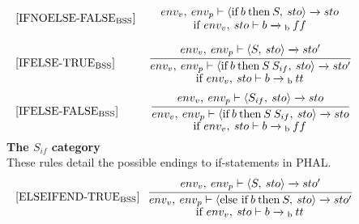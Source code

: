 \begin{equation}\label{listing:ifnoelse-false}
\begin{minipage}{.2\linewidth}
$[\text{IFNOELSE-FALSE}_\text{BSS}]$
\end{minipage}
\begin{minipage}{.8\linewidth}
\centering
$env_v, \: env_p \vdash \langle \text{if} \: b \: \text{then} \: S, \: sto \rangle \xrightarrow{} sto$ 
\\
if $env_v, \: sto \vdash b \xrightarrow{}\textsubscript{b} \: ff$
\end{minipage}
\end{equation}

\begin{equation}
\begin{minipage}{.2\linewidth}
$[\text{IFELSE-TRUE}_\text{BSS}]$
\end{minipage}
\begin{minipage}{.8\linewidth}
\centering
$\cfrac{env_v, \: env_p \vdash \langle S, \: sto \rangle \xrightarrow{} sto'}{env_v, \: env_p \vdash \langle \text{if} \: b \: \text{then} \: S \:S_{if}, \: sto \rangle \xrightarrow{} sto'}$ 
\\
if $env_v, \: sto \vdash b \xrightarrow{}\textsubscript{b} \: tt$
\end{minipage}
\end{equation}
\begin{equation}
\begin{minipage}{.2\linewidth}
$[\text{IFELSE-FALSE}_\text{BSS}]$
\end{minipage}
\begin{minipage}{.8\linewidth}
\centering
$\cfrac{env_v, \: env_p \vdash \langle S_{if}, \: sto \rangle \xrightarrow{} sto}{env_v, \: env_p \vdash \langle \text{if} \: b \: \text{then} \: S \: S_{if}, \: sto \rangle \xrightarrow{} sto}$ 
\\
if $env_v, \: sto \vdash b \xrightarrow{}\textsubscript{b} \: ff$
\end{minipage}
\end{equation}
\textbf{The $S_{if}$ category}\\
These rules detail the possible endings to if-statements in PHAL.
\begin{equation}
\begin{minipage}{.2\linewidth}
$[\text{ELSEIFEND-TRUE}_\text{BSS}]$
\end{minipage}
\begin{minipage}{.8\linewidth}
\centering
$\cfrac{env_v, \: env_p \vdash \langle S, \: sto \rangle \xrightarrow{} sto'}{env_v, \: env_p \vdash \langle \text{else if} \: b \: \text{then} \: S, \: sto \rangle \xrightarrow{} sto'}$ 
\\
if $env_v, \: sto \vdash b \xrightarrow{}\textsubscript{b} \: tt$
\end{minipage}
\end{equation}

